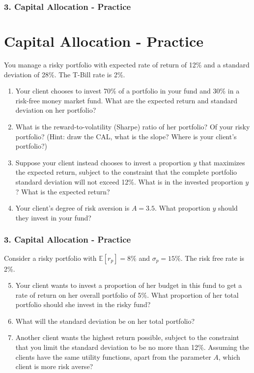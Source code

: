 \documentclass{beamer}
\begin{document}
\begin{practiceframe}[t]
    \frametitle{3. Capital Allocation - Practice}
    \section{Capital Allocation - Practice}

    \vspace{-1em}
    You manage a risky portfolio with expected rate of return of 12\% and a standard deviation of 28\%.  The T-Bill rate is 2\%.
    \begin{enumerate}
        \item Your client chooses to invest 70\% of a portfolio in your fund and 30\% in a risk-free money 
        market fund.   What are the expected return and standard deviation on her portfolio?
        \item What is the reward-to-volatility (Sharpe) ratio of her portfolio?   Of your risky portfolio?   (Hint: draw the CAL, what is the slope?  Where is your client's portfolio?)
        \item Suppose your client instead chooses to invest a proportion $y$ that maximizes the expected return, 
        subject to the constraint that the complete portfolio standard deviation will not exceed 12\%.   What is in the invested proportion $y$?   What is the 
        expected return?
        \item Your client's degree of risk aversion is $A = 3.5$.   What proportion $y$ should they invest in your fund?
    \end{enumerate}

\end{practiceframe}

\begin{practiceframe}[t]
    \frametitle{3. Capital Allocation - Practice}

    \vspace{-1em}
    Consider a risky portfolio with $\mathbb{E}[r_p]=8\%$ and $\sigma_p=15\%$.   The risk free rate is 2\%.
    \begin{enumerate}
    \setcounter{enumi}{4}
        \item Your client wants to invest a proportion of her budget in this fund to get a rate of return on her overall portfolio of 5\%.   What proportion of her total portfolio should she invest in the risky fund?
        \item What will the standard deviation be on her total portfolio?
        \item Another client wants the highest return possible, subject to the constraint that you 
        limit the standard deviation to be no more than 12\%.   Assuming the clients have the same utility functions, apart from the parameter $A$, which client is more risk averse?
    \end{enumerate}

\end{practiceframe}
\end{document}
